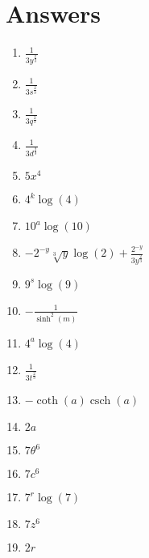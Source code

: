 \documentclass[10pt,twocolumn]{article}
\begin{document}
\section{Answers}
\begin{enumerate}
\item \(\frac{1}{3 y^{\frac{2}{3}}}\)
\item \(\frac{1}{3 s^{\frac{2}{3}}}\)
\item \(\frac{1}{3 q^{\frac{2}{3}}}\)
\item \(\frac{1}{3 d^{\frac{2}{3}}}\)
\item \(5 x^{4}\)
\item \(4^{k} \log{\left(4 \right)}\)
\item \(10^{a} \log{\left(10 \right)}\)
\item \(- 2^{- y} \sqrt[3]{y} \log{\left(2 \right)} + \frac{2^{- y}}{3 y^{\frac{2}{3}}}\)
\item \(9^{s} \log{\left(9 \right)}\)
\item \(- \frac{1}{\sinh^{2}{\left(m \right)}}\)
\item \(4^{a} \log{\left(4 \right)}\)
\item \(\frac{1}{3 t^{\frac{2}{3}}}\)
\item \(- \coth{\left(a \right)} \operatorname{csch}{\left(a \right)}\)
\item \(2 a\)
\item \(7 \theta^{6}\)
\item \(7 c^{6}\)
\item \(7^{r} \log{\left(7 \right)}\)
\item \(7 z^{6}\)
\item \(2 r\)
\end{enumerate}
\end{document}
